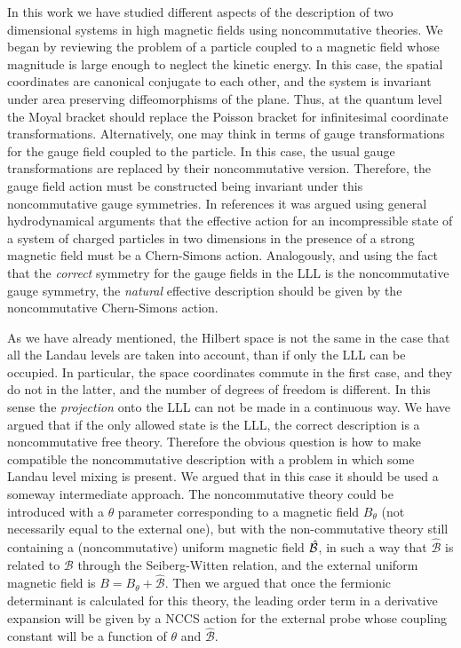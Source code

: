 \documentclass[a4paper,12pt]{article}
\begin{document}
In this work we have studied different aspects of the description
of
two dimensional systems in high magnetic fields using
noncommutative
theories.  We began by reviewing the problem of a particle coupled
to
a magnetic field whose magnitude is large enough to neglect the
kinetic energy.  In this case, the spatial coordinates are
canonical
conjugate to each other, and the system is invariant under area
preserving diffeomorphisms of the plane. Thus, at the quantum level
the Moyal bracket should replace the Poisson bracket for
infinitesimal
coordinate transformations. Alternatively, one may think in terms
of
gauge transformations for the gauge field coupled to the particle.
In
this case, the usual gauge transformations are replaced by their
noncommutative version. Therefore, the gauge field action must be
constructed being invariant under this noncommutative gauge
symmetries.  In references \cite{FZ,FK} it was argued using general
hydrodynamical arguments that the effective action for an
incompressible state of a system of charged particles in two
dimensions in the presence of a strong magnetic field must be a
Chern-Simons action.  Analogously, and using the fact that the {\it
  correct\/} symmetry for the gauge fields in the LLL is the
noncommutative gauge symmetry, the {\it natural\/} effective
description should be given by the noncommutative Chern-Simons
action.

As we have already mentioned, the Hilbert space is not the same in
the
case that all the Landau levels are taken into account, than if
only
the LLL can be occupied.  In particular, the space coordinates
commute
in the first case, and they do not in the latter, and the number of
degrees of freedom is different. In this sense the {\it
projection\/}
onto the LLL can not be made in a continuous way.  We have argued
that
if the only allowed state is the LLL, the correct description is a
noncommutative free theory. Therefore the obvious question is how
to
make compatible the noncommutative description with a problem in
which
some Landau level mixing is present.  We argued that in this case
it
should be used a someway intermediate approach. The noncommutative
theory could be introduced with a $\theta$ parameter corresponding
to a
magnetic field $B_\theta$ (not necessarily equal to the external
one), but
with the non-commutative theory still containing a (noncommutative)
uniform magnetic field $\hat {\cal B}$, in such a way that $\hat
{\mathcal B}$ is related to $\mathcal B$ through the Seiberg-Witten
relation, and the external uniform magnetic field is $B=B_\theta +
\hat
{\mathcal B}$.  Then we argued that once the fermionic determinant
is
calculated for this theory, the leading order term in a derivative
expansion will be given by a NCCS action for the external probe
whose
coupling constant will be a function of $\theta$ and $\hat
{\mathcal B}$.
\end{document}
